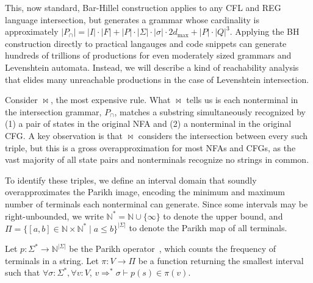 \documentclass[sigplan,review,anonymous,acmsmall]{acmart}\settopmatter{printfolios=false,printccs=false,printacmref=false}
\begin{document}

  This, now standard, Bar-Hillel construction applies to any CFL and REG language intersection, but generates a grammar whose cardinality is approximately $|P_\cap|=|I|\cdot|F| + |P|\cdot|\Sigma|\cdot|\sigma|\cdot2d_{\max} + |P|\cdot|Q|^3$. Applying the BH construction directly to practical langauges and code snippets can generate hundreds of trillions of productions for even moderately sized grammars and Levenshtein automata. Instead, we will describe a kind of reachability analysis that elides many unreachable productions in the case of Levenshtein intersection.

  Consider $\Join$, the most expensive rule. What $\Join$ tells us is each nonterminal in the intersection grammar, $P_\cap$, matches a substring simultaneously recognized by (1) a pair of states in the original NFA and (2) a nonterminal in the original CFG. A key observation is that $\Join$ considers the intersection between every such triple, but this is a gross overapproximation for most NFAs and CFGs, as the vast majority of all state pairs and nonterminals recognize no strings in common.

  To identify these triples, we define an interval domain that soundly overapproximates the Parikh image, encoding the minimum and maximum number of terminals each nonterminal can generate. Since some intervals may be right-unbounded, we write $\mathbb{N}^*=\mathbb{N} \cup \{\infty\}$ to denote the upper bound, and $\Pi = \{[a, b] \in \mathbb{N} \times \mathbb{N}^* \mid a \leq b\}^{|\Sigma|}$ to denote the Parikh map of all terminals.

  \begin{definition}
    Let $p: \Sigma^*\rightarrow\mathbb{N}^{|\Sigma|}$ be the Parikh operator~\cite{parikh1966context}, which counts the frequency of terminals in a string. Let $\pi: V \rightarrow \Pi$ be a function returning the smallest interval such that $\forall \sigma: \Sigma^*, \forall v: V$, $v \Rightarrow^* \sigma \vdash p(s) \in \pi(v)$.
  \end{definition}
\end{document}
